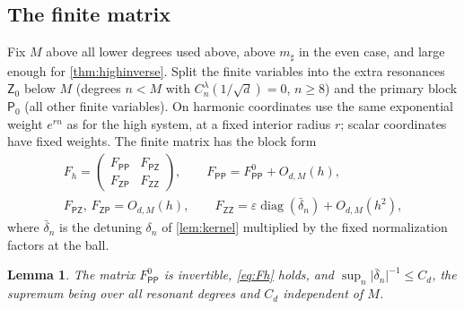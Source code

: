 \documentclass[11pt]{amsart}
\numberwithin{equation}{section}
\newtheorem{lemma}[theorem]{Lemma}
\theoremstyle{definition}
\theoremstyle{remark}
\newcommand{\eps}{\varepsilon}
\newcommand{\abs}[1]{\lvert #1\rvert}
\begin{document}
\subsection{The finite matrix}
Fix $M$ above all lower degrees used above, above $m_\sharp$ in the even case, and large enough for \cref{thm:highinverse}. Split the finite variables into the extra resonances $\mathsf Z_0$ below $M$ (degrees $n<M$ with $C^\lambda_n(1/\sqrt d)=0$, $n\ge8$) and the primary block $\mathsf P_0$ (all other finite variables). On harmonic coordinates use the same exponential weight $e^{rn}$ as for the high system, at a fixed interior radius $r$; scalar coordinates have fixed weights. The finite matrix has the block form
\begin{equation}\label{eq:Fh}
\begin{gathered}
F_h=\begin{pmatrix}F_{\mathsf{PP}}&F_{\mathsf{PZ}}\\F_{\mathsf{ZP}}&F_{\mathsf{ZZ}}\end{pmatrix},\qquad F_{\mathsf{PP}}=F^0_{\mathsf{PP}}+O_{d,M}(h),\\
F_{\mathsf{PZ}},\,F_{\mathsf{ZP}}=O_{d,M}(h),\qquad F_{\mathsf{ZZ}}=\eps\operatorname{diag}(\bar\delta_n)+O_{d,M}(h^2),
\end{gathered}
\end{equation}
where $\bar\delta_n$ is the detuning $\delta_n$ of \cref{lem:kernel} multiplied by the fixed normalization factors at the ball.

\begin{lemma}\label{lem:Fhstructure}
The matrix $F^0_{\mathsf{PP}}$ is invertible, \eqref{eq:Fh} holds, and $\sup_n\abs{\bar\delta_n}^{-1}\le C_d$, the supremum being over all resonant degrees and $C_d$ independent of $M$.
\end{lemma}
\end{document}

